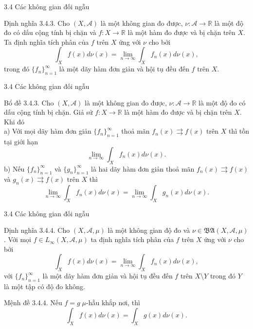 \documentclass[notheorems,envcountsect,hyperref=unicode]{beamer}
\newcommand{\R}{\mathbb R}
\def\A{\mathcal{A}}
\def\R{\mathbb{R}}
\def\Loo{\mathit{L_{\infty}}}
\def\m{\mu}
\def\disint{\displaystyle\int}
\def\hkn{hầu khắp nơi}
\def\kgdd{(X,\A,\mu)}
\begin{document}
\begin{frame}{3.4 Các không gian đối ngẫu }
\begin{block}{\textnormal{Định nghĩa 3.4.3.}}
Cho $(X,\A)$ là một không gian đo được, $\nu:\A\to \R$ là một độ đo có dấu cộng tính bị chặn và $f:X\to \R$ là một hàm đo được và bị chặn trên $X$. Ta định nghĩa tích phân của $f$ trên $X$ ứng với $\nu$ cho bởi
$$\disint_X f(x)d\nu(x)=\lim_{n\to\infty} \disint_X f_n(x)d\nu(x),$$
trong đó $\lbrace f_n\rbrace_{n=1}^{\infty}$ là một dãy hàm đơn giản và hội tụ đều đến $f$ trên $X$.
\end{block}
\end{frame}

\begin{frame}{3.4 Các không gian đối ngẫu }
\begin{block}{\textnormal{Bổ đề 3.4.3.}}
Cho $(X,\A)$ là một không gian đo được, $\nu:\A\to \R$ là một độ đo có dấu cộng tính bị chặn. Giả sử $f:X\to \R$ là một hàm đo được và bị chặn trên $X$. Khi đó\\
a) Với mọi dãy hàm đơn giản $\lbrace f_n\rbrace_{n=1}^{\infty}$ thoả mãn $f_n(x)\rightrightarrows f(x)$ trên $X$ thì tồn tại giới hạn
$$\lim_{n\to\infty}\disint_X f_n(x)d\nu(x).$$
b) Nếu $\lbrace f_n\rbrace_{n=1}^{\infty}$ và $\lbrace g_n\rbrace_{n=1}^{\infty}$ là hai dãy hàm đơn giản thoả mãn $f_n(x)\rightrightarrows f(x)$ và $g_n(x)\rightrightarrows f(x)$ trên $X$ thì
$$\lim_{n\to\infty}\disint_X f_n(x)d\nu(x)=\lim_{n\to\infty}\disint_X g_n(x)d\nu(x).$$
\end{block}
\end{frame}

\begin{frame}{3.4 Các không gian đối ngẫu }
\begin{block}{\textnormal{Định nghĩa 3.4.4.}}
Cho $\kgdd$ là một không gian độ đo và $\nu\in\mathfrak{BA}\kgdd$. Với mọi $f\in\Loo\kgdd$ ta định nghĩa tích phân của $f$ trên $X$ ứng với $\nu$ cho bởi
$$\disint_X f(x)d\nu(x)=\lim_{n\to\infty} \disint_X f_n(x)d\nu(x),$$
với $\lbrace f_n\rbrace_{n=1}^{\infty}$ là một dãy hàm đơn giản và hội tụ đều đến $f$ trên $X\setminus Y$ trong đó $Y$ là một tập có độ đo không.
\end{block}

\begin{block}{\textnormal{Mệnh đề 3.4.4.}}
Nếu $f=g\; \m$-\hkn, thì 
$$\disint_X f(x)d\nu(x)=\disint_X g(x)d\nu(x).$$
\end{block}
\end{frame}
\end{document}
